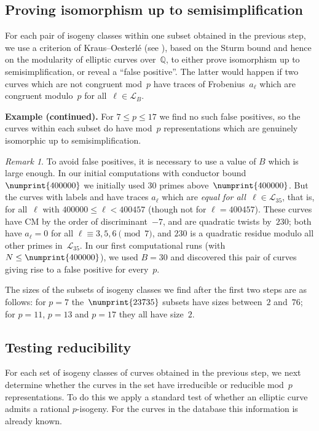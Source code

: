 \documentclass[12pt, reqno]{amsart}
\newcommand{\lmfdbec}[3]{\href{http://www.lmfdb.org/EllipticCurve/Q/#1#2#3}{{\text{\rm#1#2#3}}}}
\newcommand{\Q}{\mathbb{Q}}
\newcommand{\calL}{\mathcal{L}}
\numberwithin{equation}{section}
\theoremstyle{definition}
\theoremstyle{remark}
\newtheorem{remark}[theorem]{Remark}
\begin{document}
\subsection{Proving isomorphism up to semisimplification}

For each pair of isogeny classes within one subset obtained in the
previous step, we use a criterion of Kraus--Oesterl\'e (see
\cite[Proposition~4]{KO}), based on the Sturm bound and hence on the
modularity of elliptic curves over~$\Q$, to either prove isomorphism
up to semisimplification, or reveal a ``false positive''.  The latter
would happen if two curves which are not congruent mod~$p$ have traces
of Frobenius~$a_{\ell}$ which are congruent modulo~$p$ for
all~$\ell\in\calL_B$.

{\bf Example (continued).}  For $7\le p\le17$ we find no such false
positives, so the curves within each subset do have mod~$p$
representations which are genuinely isomorphic up to
semisimplification.

\begin{remark}
  To avoid false positives, it is necessary to use a value of $B$
  which is large enough.  In our initial computations with conductor
  bound~$\numprint{400000}$ we initially used 30 primes
  above~$\numprint{400000}$. But the curves with labels
  \lmfdbec{25921}{a}{1} and \lmfdbec{78400}{gw}{1} have traces
  $a_{\ell}$ which are \emph{equal for all~$\ell\in\calL_{35}$}, that
  is, for all~$\ell$ with $400000\le \ell<400457$ (though not for
  $\ell=400457$).  These curves have CM by the order of
  discriminant~$-7$, and are quadratic twists by~$230$; both have
  $a_\ell=0$ for all $\ell\equiv3,5,6\pmod{7}$, and $230$ is a
  quadratic residue modulo all other primes in~$\calL_{35}$. In our
  first computational runs (with $N\le\numprint{400000}$), we used
  $B=30$ and discovered this pair of curves giving rise to a false
  positive for every~$p$.
\end{remark}

The sizes of the subsets of isogeny classes we find after the first
two steps are as follows: for $p=7$ the~$\numprint{23735}$ subsets
have sizes between~$2$ and~$76$; for $p=11$, $p=13$ and $p=17$ they
all have size~$2$.

\subsection{Testing reducibility}
For each set of isogeny classes of curves obtained in the previous
step, we next determine whether the curves in the set have irreducible
or reducible mod~$p$ representations.  To do this we apply a standard
test of whether an elliptic curve admits a rational $p$-isogeny.  For
the curves in the database this information is already known.
\end{document}
